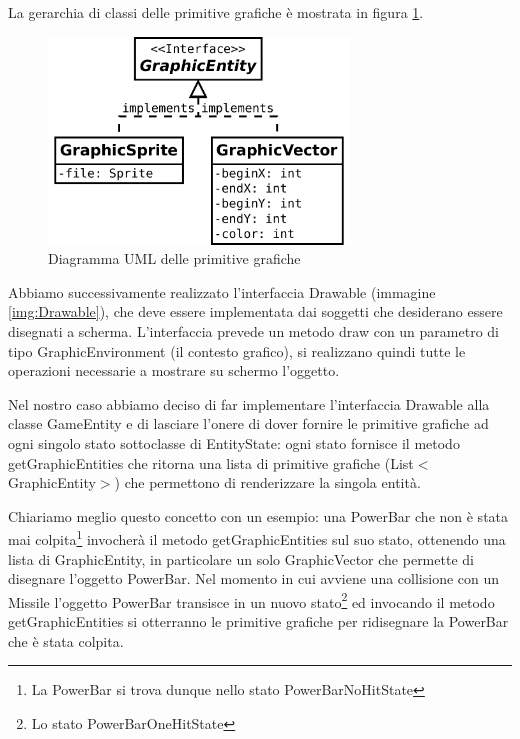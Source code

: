 \documentclass[a4paper,12pt]{article}
\begin{document}
La gerarchia di classi delle primitive grafiche \`e mostrata in figura \ref{img:GraphicEntity}.

\begin{figure}[h]
\centering
\includegraphics[width=8cm]{GraphicEntity.pdf}
\caption{Diagramma UML delle primitive grafiche}
\label{img:GraphicEntity}
\end{figure}

Abbiamo successivamente realizzato l'interfaccia \textsf{Drawable} (immagine \ref{img:Drawable}), che deve essere implementata dai soggetti che desiderano essere disegnati a scherma. L'interfaccia prevede un metodo \textsf{draw} con  un parametro di tipo \textsf{GraphicEnvironment} (il contesto grafico), si realizzano quindi tutte le operazioni necessarie a mostrare su schermo l'oggetto.

Nel nostro caso abbiamo deciso di far implementare l'interfaccia \textsf{Drawable} alla classe \textsf{GameEntity} e di lasciare l'onere di dover fornire le primitive grafiche ad ogni singolo stato sottoclasse di \textsf{EntityState}: ogni stato fornisce il metodo \textsf{getGraphicEntities} che ritorna una lista di primitive grafiche (\textsf{List}$<$\textsf{GraphicEntity}$>$) che permettono di renderizzare la singola entit\`a.

Chiariamo meglio questo concetto con un esempio: una \textsf{PowerBar} che non \`e stata mai colpita\footnote{La \textsf{PowerBar} si trova dunque nello stato \textsf{PowerBarNoHitState}} invocher\`a il metodo \textsf{getGraphicEntities} sul suo stato, ottenendo una lista di \textsf{GraphicEntity}, in particolare un solo \textsf{GraphicVector} che permette di disegnare l'oggetto \textsf{PowerBar}. Nel momento in cui avviene una collisione con un \textsf{Missile} l'oggetto \textsf{PowerBar} transisce in un nuovo stato\footnote{Lo stato \textsf{PowerBarOneHitState}} ed invocando il metodo \textsf{getGraphicEntities} si otterranno le primitive grafiche per ridisegnare la \textsf{PowerBar} che \`e stata colpita.
\end{document}
